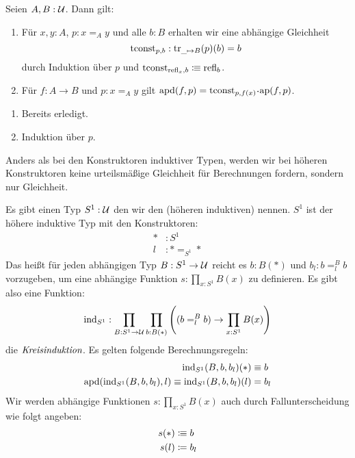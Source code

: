 \begin{bemerkung}
  \label{bem:transpconst}
  Seien $A,B:\mathcal{U}$. Dann gilt:
  \begin{enumerate}
  \item Für $x,y:A$, $p:x=_A y$ und alle $b:B$ erhalten wir eine abhängige Gleichheit
    \[
      \mathrm{tconst}_{p,b}:\mathrm{tr}_{\_\mapsto B}(p)(b)=b
    \]
    durch Induktion über $p$ und $\mathrm{tconst}_{\mathrm{refl}_x,b}\vcentcolon\mspace{-1.2mu}\equiv \mathrm{refl}_b$.
  \item Für $f:A \to B$ und $p:x =_A y$ gilt $\mathrm{apd}(f,p)= \transpconst_{p,f(x)}\kon\mathrm{ap}(f,p)$.
  \end{enumerate}
\end{bemerkung}
\begin{beweis}
  \begin{enumerate}
  \item Bereits erledigt.
  \item Induktion über $p$.
  \end{enumerate}
\end{beweis}


Anders als bei den Konstruktoren induktiver Typen, werden wir bei höheren Konstruktoren keine urteilsmäßige Gleichheit für Berechnungen fordern,
sondern nur Gleichheit.

\begin{regeln}
  Es gibt einen Typ $S^1:\mathcal{U}$ den wir den (höheren induktiven)  nennen.
  $S^1$ ist der höhere induktive Typ mit den Konstruktoren:
  \begin{align*}
    \ast&:S^1 \\
    l&:\ast =_{S^1}\ast
  \end{align*}
  Das heißt für jeden abhängigen Typ $B:S^1\to\mathcal{U}$ reicht es $b:B(\ast)$ und $b_l:b =_l^B b$ vorzugeben,
  um eine abhängige Funktion $s:\prod_{x:S^1}B(x)$ zu definieren.
  Es gibt also eine Funktion:
  \[
    \mathrm{ind}_{S^1}:\prod_{B:S^1\to\mathcal{U}}\prod_{b:B(\ast)}\left((b =_l^B b)\to\prod_{x:S^1}B(x)\right)
  \]
  die $\begriff{Kreisinduktion}$.
  Es gelten folgende Berechnungsregeln:
  \begin{align*}
    \mathrm{ind}_{S^1}(B,b,b_l)(\ast)&\equiv b \\
    \mathrm{apd}(\mathrm{ind}_{S^1}(B,b,b_l),l)\equiv \mathrm{ind}_{S^1}(B,b,b_l)(l)&=b_l
  \end{align*}
  Wir werden abhängige Funktionen $s:\prod_{x:S^1}B(x)$ auch durch Fallunterscheidung wie folgt angeben:
  \begin{align*}
    s(\ast) &\vcentcolon\mspace{-1.2mu}\equiv b \\
    s(l) &\coloneqq b_l
  \end{align*}
\end{regeln}

